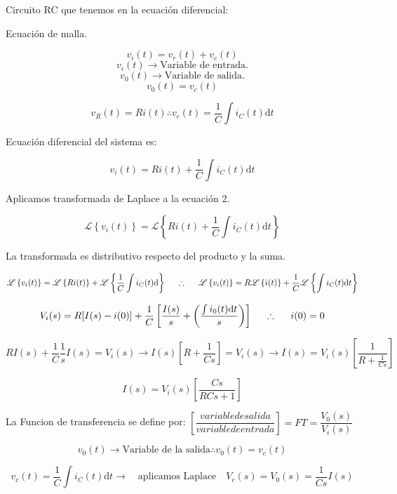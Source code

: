 \documentclass[12pt]{article}
\begin{document}
Circuito RC que tenemos en la ecuación diferencial:

Ecuación de malla.

    $$v_{i}(t) = v_{r}(t) + v_{c}(t)$$
    $$v_{i}(t) \rightarrow \text{Variable de entrada.}$$
    $$v_{0}(t) \rightarrow \text{Variable de salida.}$$
    $$v_{0}(t)=v_{c}(t)$$

    $$v_{R}(t)=Ri(t) \therefore v_{c}(t)=\frac{1}{C}\int i_{C}(t) \mathrm{d}t$$

Ecuación diferencial del sistema es: 

$$v_{i}(t)=Ri(t)+\frac{1}{C}\int i_{C}(t) \mathrm{d}t$$

Aplicamos transformada de Laplace a la ecuación 2.


$$\mathscr{L} \left \{ v_{i}(t) \right \} =\mathscr{L} \left \{ Ri(t)+\frac{1}{C}\int i_{C}(t) \mathrm{d}t \right \}$$

La transformada es distributivo respecto del producto y la suma.


$$\mathscr{L} \left \{ v_{i}(t) \right \} =\mathscr{L} \left \{ Ri(t) \right \} + \mathscr{L} \left \{ \frac{1}{C}\int i_{C}(t) \mathrm{d} \right \} \hspace{0.5cm} \therefore \hspace{0.5cm} \mathscr{L} \left \{ v_{i}(t) \right \} = R \mathscr{L} \left \{ i(t) \right \} + \frac{1}{C} \mathscr{L} \left \{ \int i_{C}(t) \mathrm{d}t \right \}$$



$$ V_{i}(s) = R[I(s)-i(0)] + \frac{1}{C} \left[ \frac{I(s)}{s} + \left( \frac{ \int i_{0}(t) \mathrm{d}t }{s} \right) \right] \hspace{0.5cm} \therefore \hspace{0.5cm} i(0) = 0$$

$$RI(s) + \frac{1}{C}\frac{1}{s}I(s) = V_{i}(s)  \rightarrow  I(s)\left[R + \frac{1}{Cs} \right]=V_{i}(s) \rightarrow I(s) = V_{i}(s)\left[ \frac{1}{R + \frac{1}{Cs}}\right]$$

$$I(s) = V_{i}(s) \left[\frac{Cs}{RCs + 1} \right]$$


La Funcion de transferencia se define por:  $\left[ \dfrac{variable de salida}{variable de entrada}\right] = FT = \dfrac{V_{0}(s)}{V_{i}(s)}$


$$ v_{0}(t) \rightarrow  \text{Variable de la salida} \therefore v_{0}(t)=v_{c}(t) $$


$$v_{c}(t) = \frac{1}{C}\int i_{C}(t) \mathrm{d}t \rightarrow \quad\text{aplicamos Laplace}\quad  V_{c}(s)=V_{0}(s)=\frac{1}{Cs}I(s) $$
\end{document}
